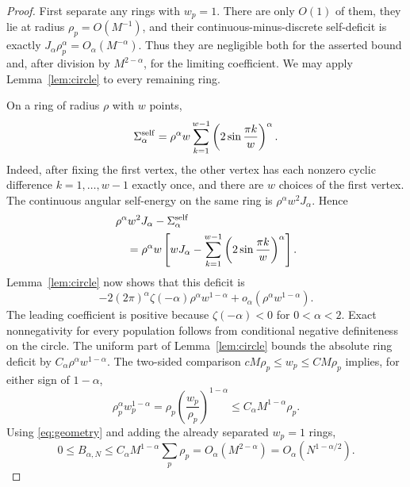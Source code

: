 \documentclass[11pt]{amsart}
\begin{document}
\begin{proof}
First separate any rings with $w_p=1$.  There are only $O(1)$ of them,
they lie at radius $\rho_p=O(M^{-1})$, and their continuous-minus-discrete
self-deficit is exactly $J_\alpha\rho_p^\alpha=O_\alpha(M^{-\alpha})$.
Thus they are negligible both for the asserted bound and, after division by
$M^{2-\alpha}$, for the limiting coefficient.  We may apply
Lemma~\ref{lem:circle} to every remaining ring.

On a ring of radius $\rho$ with $w$ points,
\[
 \Sigma_{\alpha}^{\rm self}
 =\rho^\alpha w\sum_{k=1}^{w-1}
 \left(2\sin\frac{\pi k}{w}\right)^\alpha.
\]
Indeed, after fixing the first vertex, the other vertex has each nonzero
cyclic difference $k=1,\ldots,w-1$ exactly once, and there are $w$ choices
of the first vertex.  The continuous angular self-energy on the same ring is
$\rho^\alpha w^2J_\alpha$.  Hence
\begin{align*}
 &\rho^\alpha w^2J_\alpha-\Sigma_{\alpha}^{\rm self}\\
 &\quad=\rho^\alpha w\left[
 wJ_\alpha-\sum_{k=1}^{w-1}
 \left(2\sin\frac{\pi k}{w}\right)^\alpha\right].
\end{align*}
Lemma~\ref{lem:circle} now shows that this deficit is
\begin{equation}\label{eq:ringdef}
 -2(2\pi)^\alpha\zeta(-\alpha)
 \rho^\alpha w^{1-\alpha}+o_\alpha
 (\rho^\alpha w^{1-\alpha}).                         \tag{3.2}
\end{equation}
The leading coefficient is positive because $\zeta(-\alpha)<0$ for
$0<\alpha<2$.  Exact nonnegativity for every population follows from
conditional negative definiteness on the circle.
The uniform part of Lemma~\ref{lem:circle} bounds the absolute ring deficit
by $C_\alpha\rho^\alpha w^{1-\alpha}$.  The two-sided comparison
$cM\rho_p\le w_p\le CM\rho_p$ implies, for either sign of $1-\alpha$,
\[
 \rho_p^\alpha w_p^{1-\alpha}
 =\rho_p\left(\frac{w_p}{\rho_p}\right)^{1-\alpha}
 \le C_\alpha M^{1-\alpha}\rho_p.
\]
Using \eqref{eq:geometry} and adding the already separated $w_p=1$ rings,
\[
 0\le B_{\alpha,N}
 \le C_\alpha M^{1-\alpha}\sum_p\rho_p
 =O_\alpha(M^{2-\alpha})
 =O_\alpha(N^{1-\alpha/2}).
\]


\end{proof}
\end{document}
